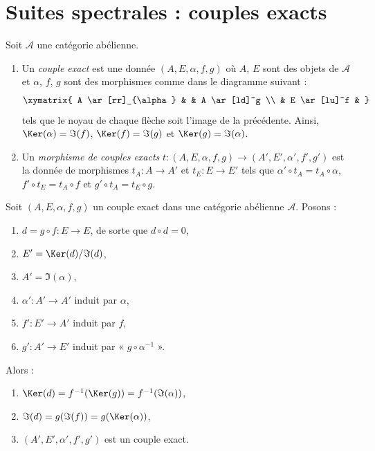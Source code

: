 \section{Suites spectrales : couples exacts}
\label{section-exact-couple}

\begin{definition}
\label{definition-exact-couple}
Soit $\mathcal{A}$ une catégorie abélienne.
\begin{enumerate}
\item Un {\it couple exact} est une donnée $(A, E, \alpha, f, g)$ où
$A$, $E$ sont des objets de $\mathcal{A}$ et $\alpha$, $f$, $g$
sont des morphismes comme dans le diagramme suivant :
$$
\xymatrix{
A \ar[rr]_{\alpha} & & A \ar[ld]^g \\
& E \ar[lu]^f &
}
$$
tels que le noyau de chaque flèche soit l'image
de la précédente. Ainsi, $\Ker(\alpha) = \Im(f)$,
$\Ker(f) = \Im(g)$ et $\Ker(g) = \Im(\alpha)$.
\item Un {\it morphisme de couples exacts}
$t : (A, E, \alpha, f, g) \to (A', E', \alpha', f', g')$
est la donnée de morphismes $t_A : A \to A'$ et
$t_E : E \to E'$ tels que
$\alpha' \circ t_A = t_A \circ \alpha$,
$f' \circ t_E = t_A \circ f$ et
$g' \circ t_A = t_E \circ g$.
\end{enumerate}
\end{definition}

\begin{lemma}
\label{lemma-derived-exact-couple}
Soit $(A, E, \alpha, f, g)$ un couple exact dans une catégorie abélienne
$\mathcal{A}$. Posons :
\begin{enumerate}
\item $d = g \circ f : E \to E$, de sorte que $d \circ d = 0$,
\item $E' = \Ker(d)/\Im(d)$,
\item $A' = \Im(\alpha)$,
\item $\alpha' : A' \to A'$ induit par $\alpha$,
\item $f' : E' \to A'$ induit par $f$,
\item $g' : A' \to E'$ induit par « $g \circ \alpha^{-1}$ ».
\end{enumerate}
Alors :
\begin{enumerate}
\item $\Ker(d) = f^{-1}(\Ker(g)) = f^{-1}(\Im(\alpha))$,
\item $\Im(d) = g(\Im(f)) = g(\Ker(\alpha))$,
\item $(A', E', \alpha', f', g')$ est un couple exact.
\end{enumerate}
\end{lemma}

